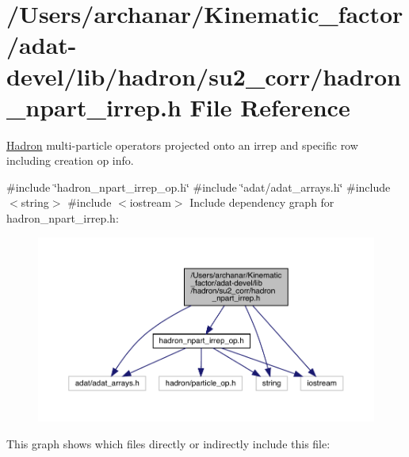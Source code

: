 \hypertarget{adat-devel_2lib_2hadron_2su2__corr_2hadron__npart__irrep_8h}{}\section{/\+Users/archanar/\+Kinematic\+\_\+factor/adat-\/devel/lib/hadron/su2\+\_\+corr/hadron\+\_\+npart\+\_\+irrep.h File Reference}
\label{adat-devel_2lib_2hadron_2su2__corr_2hadron__npart__irrep_8h}


\mbox{\hyperlink{namespaceHadron}{Hadron}} multi-\/particle operators projected onto an irrep and specific row including creation op info.  


{\ttfamily \#include \char`\"{}hadron\+\_\+npart\+\_\+irrep\+\_\+op.\+h\char`\"{}}\newline
{\ttfamily \#include \char`\"{}adat/adat\+\_\+arrays.\+h\char`\"{}}\newline
{\ttfamily \#include $<$string$>$}\newline
{\ttfamily \#include $<$iostream$>$}\newline
Include dependency graph for hadron\+\_\+npart\+\_\+irrep.\+h\+:
\nopagebreak
\begin{figure}[H]
\begin{center}
\leavevmode
\includegraphics[width=350pt]{d6/d57/adat-devel_2lib_2hadron_2su2__corr_2hadron__npart__irrep_8h__incl}
\end{center}
\end{figure}
This graph shows which files directly or indirectly include this file\+:
\nopagebreak
